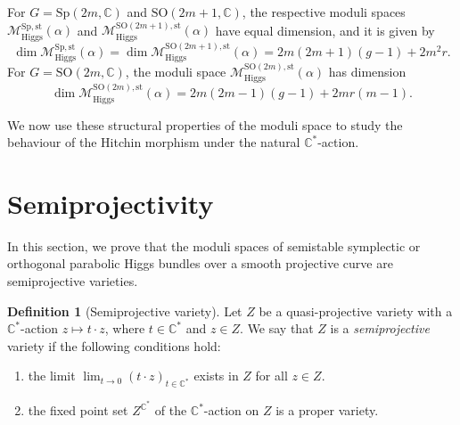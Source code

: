 \documentclass[11pt, reqno]{amsart}
\numberwithin{equation}{section}
\theoremstyle{definition}
\newtheorem{definition}[theorem]{Definition}
\begin{document}
For $G=\mathrm{Sp}(2m,\mathbb{C})$ and $\mathrm{SO}(2m+1,\mathbb{C})$, the respective moduli spaces $\mathcal{M}^{\mathrm{Sp},\mathrm{st}}_{\mathrm{Higgs}}(\alpha)$ and $\mathcal{M}^{\mathrm{SO}(2m+1),\mathrm{st}}_{\mathrm{Higgs}}(\alpha)$ have equal dimension, and it is given by
\[
\dim \mathcal{M}^{\mathrm{Sp},\mathrm{st}}_{\mathrm{Higgs}}(\alpha) =\dim \mathcal{M}^{\mathrm{SO}(2m+1),\mathrm{st}}_{\mathrm{Higgs}}(\alpha)= 2m(2m+1)(g-1) + 2m^2r.
\]
For $G=\mathrm{SO}(2m,\mathbb{C})$, the moduli space $\mathcal{M}^{\mathrm{SO}(2m),\mathrm{st}}_{\mathrm{Higgs}}(\alpha)$ has dimension
\[
\dim \mathcal{M}^{\mathrm{SO}(2m),\mathrm{st}}_{\mathrm{Higgs}}(\alpha) = 2m(2m-1)(g-1) + 2mr(m-1).
\]

We now use these structural properties of the moduli space to study the behaviour of the Hitchin morphism under the natural $\mathbb{C}^*$-action.

\section{Semiprojectivity}\label{semiproj}
In this section, we prove that the moduli spaces of semistable symplectic or orthogonal parabolic Higgs bundles over a smooth projective curve are semiprojective varieties.



	\begin{definition}[Semiprojective variety]\label{semiprojective}
	Let $Z$ be a quasi-projective variety with a $\mathbb{C}^*$-action $z \mapsto t\cdot z$, where $t \in \mathbb{C}^*$ and $z\in Z$. We say that $Z$ is a \textit{semiprojective} variety if the following conditions hold:
	\begin{enumerate}
	    \item the limit $\lim_{t\to 0} (t\cdot z)_{t\in \mathbb{C}^*}$ exists in $Z$ for all $z \in Z$.
	    \vspace{0.1cm}
	    \item the fixed point set $Z^{\mathbb{C}^*}$ of the $\mathbb{C}^*$-action on $Z$ is a proper variety.
\end{enumerate}
\end{definition}
\end{document}

